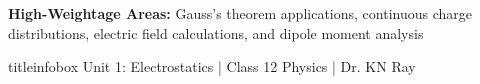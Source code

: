 \begin{frame}
\vspace{0.35cm}

\begin{importantbox}
\textbf{High-Weightage Areas:} Gauss's theorem applications, continuous charge distributions, electric field calculations, and dipole moment analysis
\end{importantbox}

\vfill

\begin{beamercolorbox}[wd=\textwidth,ht=0.5cm,dp=0.1cm,center]{titleinfobox}
    \small\color{coolgray} Unit 1: Electrostatics | Class 12 Physics | Dr. KN Ray
\end{beamercolorbox}
\end{frame}

